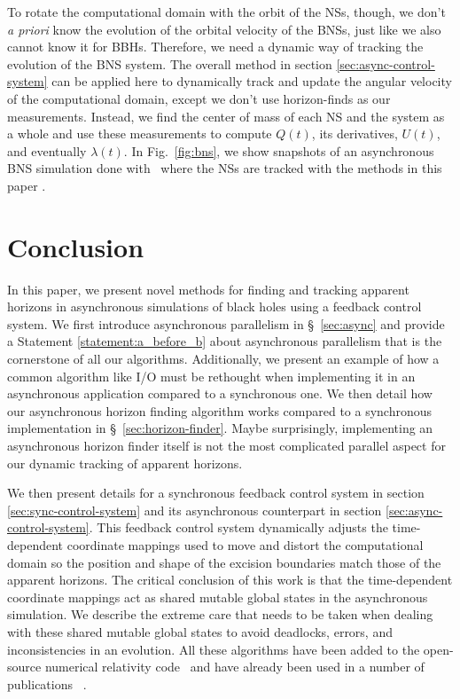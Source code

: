\begin{bibunit}[unsrtnat]
To rotate the computational domain with the orbit of the NSs, though, we don't
\textit{a priori} know the evolution of the orbital velocity of the BNSs, just
like we also cannot know it for BBHs. Therefore, we need a dynamic way of
tracking the evolution of the BNS system. The overall method in section
\ref{sec:async-control-system} can be applied here to dynamically track and
update the angular velocity of the computational domain, except we don't use
horizon-finds as our measurements. Instead, we find the center of mass of each
NS and the system as a whole and use these measurements to compute $Q(t)$, its
derivatives, $U(t)$, and eventually $\lambda(t)$. In Fig.~\ref{fig:bns}, we
show snapshots of an asynchronous BNS simulation done with \spectre~where the
NSs are tracked with the methods in this paper \cite{Habib:2025bkb}.

\section{Conclusion\label{sec:3_conclusion}}

In this paper, we present novel methods for finding and tracking apparent
horizons in asynchronous simulations of black holes using a feedback control
system. We first introduce asynchronous parallelism in \S~\ref{sec:async}
and provide a Statement \ref{statement:a_before_b} about asynchronous
parallelism that is the cornerstone of all our algorithms. Additionally, we
present an example of how a common algorithm like I/O must be rethought when
implementing it in an asynchronous application compared to a synchronous one. We
then detail how our asynchronous horizon finding algorithm works compared to a
synchronous implementation in \S~\ref{sec:horizon-finder}. Maybe
surprisingly, implementing an asynchronous horizon finder itself is not the most
complicated parallel aspect for our dynamic tracking of apparent horizons.

We then present details for a synchronous feedback control system in section
\ref{sec:sync-control-system} and its asynchronous counterpart in section
\ref{sec:async-control-system}. This feedback control system dynamically adjusts
the time-dependent coordinate mappings used to move and distort the
computational domain so the position and shape of the excision boundaries match
those of the apparent horizons. The critical conclusion of this work is that the
time-dependent coordinate mappings act as shared mutable global states in the
asynchronous simulation. We describe the extreme care that needs to be taken
when dealing with these shared mutable global states to avoid deadlocks, errors,
and inconsistencies in an evolution. All these algorithms have been added to the
open-source numerical relativity code \spectre~and have already been used in a
number of publications
~\cite{Deppe:2024ckt, Lovelace:2024wra, Lara:2024rwa, Wittek:2024pis,
  Lara:2025kzj, Habib:2025bkb}.


\end{bibunit}
